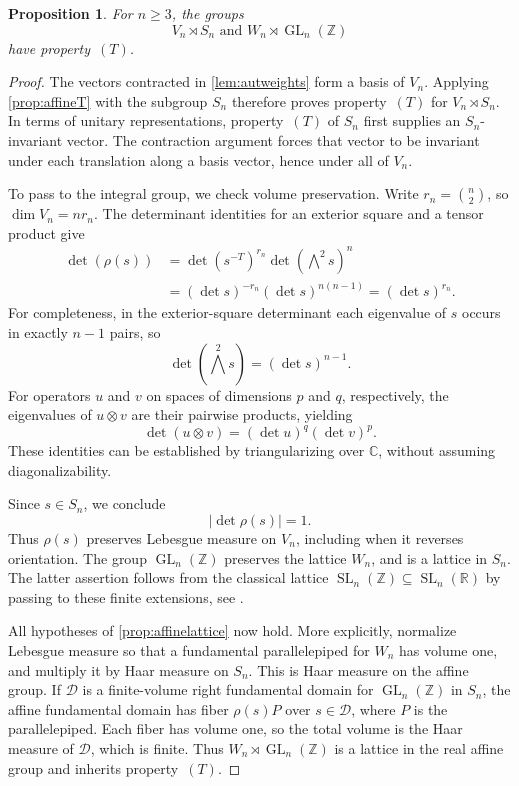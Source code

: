 \documentclass[11pt,a4paper]{article}
\newtheorem{proposition}[theorem]{Proposition}
\theoremstyle{definition}
\newcommand{\R}{\mathbb R}
\newcommand{\Z}{\mathbb Z}
\newcommand{\C}{\mathbb C}
\newcommand{\SL}{\operatorname{SL}}
\newcommand{\GL}{\operatorname{GL}}
\newcommand{\rt}{(T)}
\begin{document}
\begin{proposition}\label{prop:autaffineT}
For \(n\ge3\), the groups \[V_n\rtimes S_n \text{\ \ \ \  and\ \ \ \ \ }
W_n\rtimes\GL_n(\Z)\] have property~\(\rt\).
\end{proposition}
\begin{proof}
The vectors contracted in \cref{lem:autweights} form a basis
of \(V_n\). Applying \cref{prop:affineT} with the subgroup
\(S_n\) therefore proves property~\(\rt\) for
\(V_n\rtimes S_n\). In terms of unitary representations,
property~\(\rt\) of \(S_n\) first supplies an
\(S_n\)-invariant vector. The contraction argument forces
that vector to be invariant under each translation along a
basis vector, hence under all of \(V_n\).

To pass to the integral group, we check volume preservation.
Write \(r_n=\binom n2\), so \(\dim V_n=nr_n\). The
determinant identities for an exterior square and a tensor
product give
\[
 \begin{aligned}
 \det(\rho(s))
 &=\det(s^{-T})^{r_n}
       \det\left(\bigwedge\nolimits^2s\right)^{n}\\
 &=(\det s)^{-r_n}(\det s)^{n(n-1)}
   =(\det s)^{r_n}.
 \end{aligned}
\]
For completeness, in the exterior-square determinant each
eigenvalue of \(s\) occurs in exactly \(n-1\) pairs, so
\[\det\left(\bigwedge^2s\right)=(\det s)^{n-1}.\]
For operators
\(u\) and \(v\) on spaces of dimensions \(p\) and \(q\),
respectively, the eigenvalues of \(u\otimes v\) are their
pairwise products, yielding
\[\det(u\otimes v)=(\det u)^q(\det v)^p.\]
These identities can be established by triangularizing over
\(\C\), without assuming diagonalizability.

Since \(s\in S_n\), we conclude
\[|\det\rho(s)|=1.\] Thus \(\rho(s)\) preserves Lebesgue
measure on \(V_n\), including when it reverses orientation.
The group \(\GL_n(\Z)\) preserves the lattice \(W_n\), and
is a lattice in \(S_n\). The latter assertion follows from
the classical lattice \(\SL_n(\Z)\subseteq\SL_n(\R)\) by passing
to these finite extensions, see \cite[Appendix~B]{BHV}.


All hypotheses of \cref{prop:affinelattice} now hold. More
explicitly, normalize Lebesgue measure so that a fundamental
parallelepiped for \(W_n\) has volume one, and multiply it
by Haar measure on \(S_n\). This is Haar measure on the
affine group. If \(\mathcal D\) is a finite-volume right
fundamental domain for \(\GL_n(\Z)\) in \(S_n\), the affine
fundamental domain has fiber \(\rho(s)P\) over \(s\in
\mathcal D\), where \(P\) is the parallelepiped. Each fiber
has volume one, so the total volume is the Haar measure of
\(\mathcal D\), which is finite. Thus
\(W_n\rtimes\GL_n(\Z)\) is a lattice in the real affine
group and inherits property~\(\rt\).
\end{proof}
\end{document}
